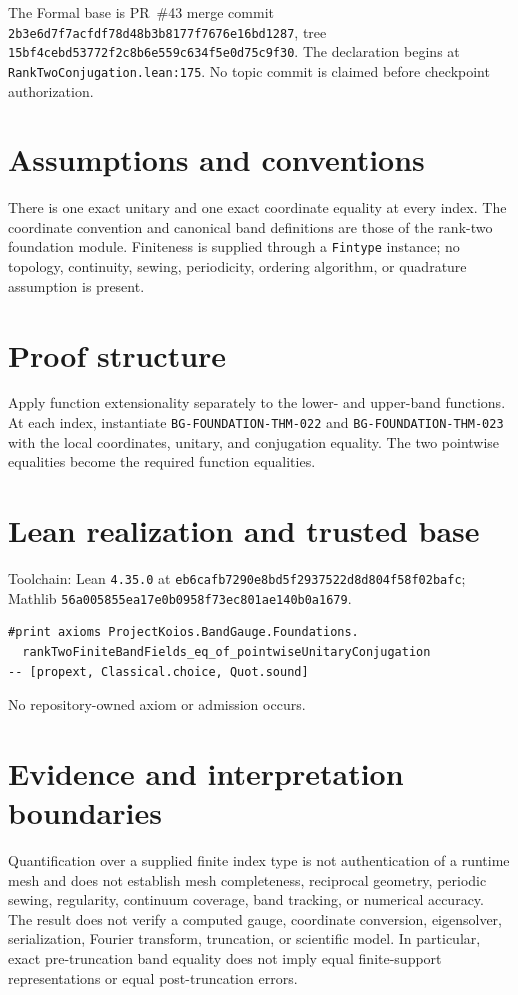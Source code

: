 \documentclass[10pt]{article}
\begin{document}
The Formal base is PR~\#43 merge commit
\texttt{2b3e6d7f7acfdf78d48b3b8177f7676e16bd1287}, tree
\texttt{15bf4cebd53772f2c8b6e559c634f5e0d75c9f30}. The declaration begins at
\texttt{RankTwoConjugation.lean:175}. No topic commit is claimed before checkpoint authorization.

\section{Assumptions and conventions}
There is one exact unitary and one exact coordinate equality at every index. The coordinate
convention and canonical band definitions are those of the rank-two foundation module. Finiteness
is supplied through a \texttt{Fintype} instance; no topology, continuity, sewing, periodicity,
ordering algorithm, or quadrature assumption is present.

\section{Proof structure}
Apply function extensionality separately to the lower- and upper-band functions. At each index,
instantiate \texttt{BG-FOUNDATION-THM-022} and \texttt{BG-FOUNDATION-THM-023} with the local
coordinates, unitary, and conjugation equality. The two pointwise equalities become the required
function equalities.

\section{Lean realization and trusted base}
Toolchain: Lean \texttt{4.35.0} at
\texttt{eb6cafb7290e8bd5f2937522d8d804f58f02bafc}; Mathlib
\texttt{56a005855ea17e0b0958f73ec801ae140b0a1679}.
\begin{verbatim}
#print axioms ProjectKoios.BandGauge.Foundations.
  rankTwoFiniteBandFields_eq_of_pointwiseUnitaryConjugation
-- [propext, Classical.choice, Quot.sound]
\end{verbatim}
No repository-owned axiom or admission occurs.

\section{Evidence and interpretation boundaries}
Quantification over a supplied finite index type is not authentication of a runtime mesh and does not
establish mesh completeness, reciprocal geometry, periodic sewing, regularity, continuum
coverage, band tracking, or numerical accuracy. The result does not verify a computed gauge,
coordinate conversion, eigensolver, serialization, Fourier transform, truncation, or scientific
model. In particular, exact pre-truncation band equality does not imply equal finite-support
representations or equal post-truncation errors.
\end{document}
